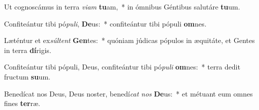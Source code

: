 \item Ut cognoscámus in terra \textit{vi}\textit{am} \textbf{tu}am,~* in ómnibus Géntibus salutáre \textbf{tu}um.
\item Confiteántur tibi pó\textit{pu}\textit{li}, \textbf{De}us:~* confiteántur tibi pópuli \textbf{om}nes.
\item Læténtur et ex\textit{súl}\textit{tent} \textbf{Gen}tes:~* quóniam júdicas pópulos in æquitáte, et Gentes in terra \textbf{dí}rigis.
\item Confiteántur tibi pópuli, Deus, confiteántur tibi pó\textit{pu}\textit{li} \textbf{om}nes:~* terra dedit fructum \textbf{su}um.
\item Benedícat nos Deus, Deus noster, benedí\textit{cat} \textit{nos} \textbf{De}us:~* et métuant eum omnes fines \textbf{ter}ræ.
